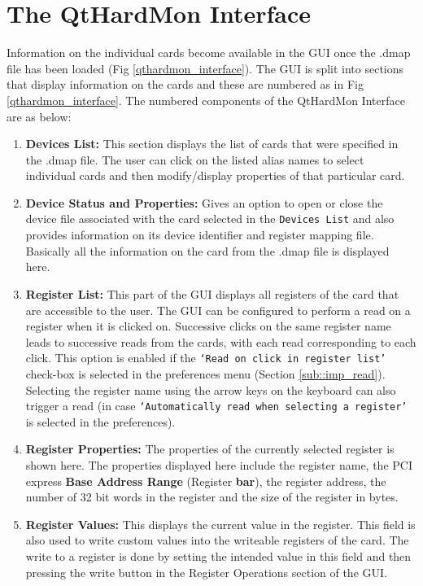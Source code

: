 \section{The QtHardMon Interface}
Information on the individual cards become available in the GUI once the .dmap file has been loaded (Fig \ref{qthardmon_interface}). The GUI is split into sections that display information on the cards and these are numbered as in Fig \ref{qthardmon_interface}. The numbered components of the QtHardMon Interface are as below:
\begin{enumerate}
\item \textbf{Devices List:} This section displays the list of cards that were specified in the .dmap file. The user can click on the listed alias names to select individual cards and then modify/display properties of that particular card. 

\item \textbf{Device Status and Properties:} Gives an option to open or close the device file associated with the card selected in the \texttt{Devices List} and also provides information on its device identifier and register mapping file. Basically all the information on the card from the .dmap file is displayed here. 

\item \textbf{Register List:} This part of the GUI displays all registers of the card that are accessible to the user. The GUI can be configured to perform a read on a register when it is clicked on. Successive clicks on the same register name leads to successive reads from the cards, with each read corresponding to each click. This option is enabled if the \texttt{`Read on click in register list'} check-box is selected in the preferences menu (Section \ref{sub::imp_read}). Selecting the register name using the arrow keys on the keyboard can also trigger a read (in case \texttt{`Automatically read when selecting a register'} is selected in the preferences).

\item \textbf{Register Properties:} The properties of the currently selected register is shown here. The properties displayed here include the register name, the PCI express \textbf{Base Address Range} (Register \textbf{bar}), the register address, the number of 32 bit words in the register and the size of the register in bytes.

\item \textbf{Register Values:} This displays the current value in the register. This field is also used to write custom values into the writeable registers of the card. The write to a register is done by setting the intended value in this field and then pressing the write button in the Register Operations section  of the GUI.


\end{enumerate}

